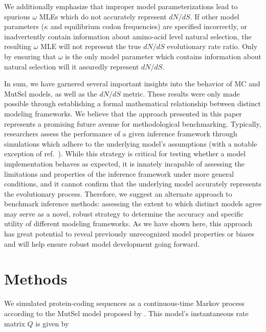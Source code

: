 \documentclass{pnastwo}
\begin{document}
\begin{article}
We additionally emphasize that improper model parameterizations lead to spurious $\omega$ MLEs which do not accurately represent $dN/dS$. If other model parameters ($\kappa$ and equilibrium codon frequencies) are specified incorrectly, or inadvertently contain information about amino-acid level natural selection, the resulting $\omega$ MLE will not represent the true $dN/dS$ evolutionary rate ratio. Only by ensuring that $\omega$ is the only model parameter which contains information about natural selection will it assuredly represent $dN/dS$. 

In sum, we have garnered several important insights into the behavior of MC and MutSel models, as well as the $dN/dS$ metric. These results were only made possible through establishing a formal mathematical relationship between distinct modeling frameworks. We believe that the approach presented in this paper represents a promising future avenue for methodological benchmarking. Typically, researchers assess the performance of a given inference framework through simulations which adhere to the underlying model's assumptions (with a notable exception of ref.\ \cite{Holder2008}). While this strategy is critical for testing whether a model implementation behaves as expected, it is innately incapable of assessing the limitations and properties of the inference framework under more general conditions, and it cannot confirm that the underlying model accurately represents the evolutionary process. Therefore, we suggest an alternate approach to benchmark inference methods: assessing the extent to which distinct models agree may serve as a novel, robust strategy to determine the accuracy and specific utility of different modeling frameworks. As we have shown here, this approach has great potential to reveal previously unrecognized model properties or biases and will help ensure robust model development going forward.


\section*{Methods}

We simulated protein-coding sequences as a continuous-time Markov process \cite{Yang2006} according to the MutSel model proposed by \cite{HalpernBruno1998}. This model's instantaneous rate matrix $Q$ is given by 


\end{article}
\end{document}
